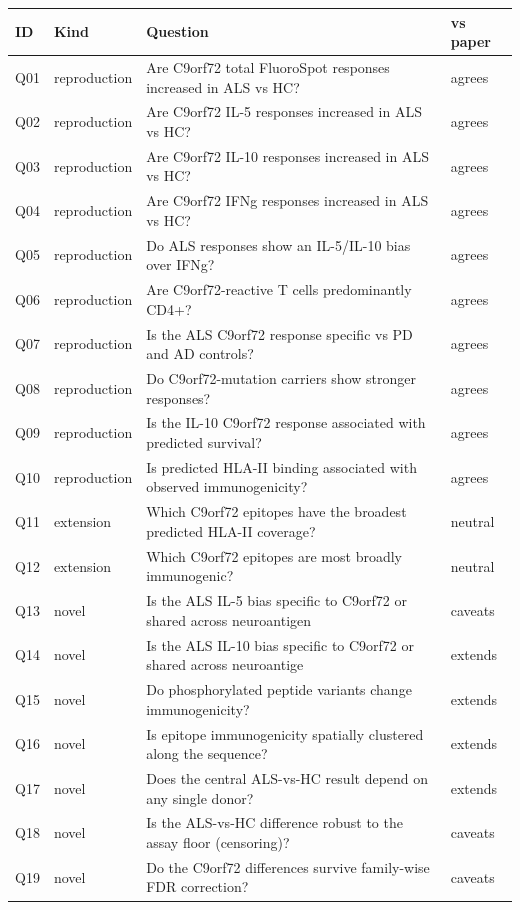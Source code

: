 \begin{tabular}{llp{8.3cm}l}
\toprule
ID & Kind & Question & vs paper \\
\midrule
Q01 & reproduction & Are C9orf72 total FluoroSpot responses increased in ALS vs HC? & agrees \\
Q02 & reproduction & Are C9orf72 IL-5 responses increased in ALS vs HC? & agrees \\
Q03 & reproduction & Are C9orf72 IL-10 responses increased in ALS vs HC? & agrees \\
Q04 & reproduction & Are C9orf72 IFNg responses increased in ALS vs HC? & agrees \\
Q05 & reproduction & Do ALS responses show an IL-5/IL-10 bias over IFNg? & agrees \\
Q06 & reproduction & Are C9orf72-reactive T cells predominantly CD4+? & agrees \\
Q07 & reproduction & Is the ALS C9orf72 response specific vs PD and AD controls? & agrees \\
Q08 & reproduction & Do C9orf72-mutation carriers show stronger responses? & agrees \\
Q09 & reproduction & Is the IL-10 C9orf72 response associated with predicted survival? & agrees \\
Q10 & reproduction & Is predicted HLA-II binding associated with observed immunogenicity? & agrees \\
Q11 & extension & Which C9orf72 epitopes have the broadest predicted HLA-II coverage? & neutral \\
Q12 & extension & Which C9orf72 epitopes are most broadly immunogenic? & neutral \\
Q13 & novel & Is the ALS IL-5 bias specific to C9orf72 or shared across neuroantigen & caveats \\
Q14 & novel & Is the ALS IL-10 bias specific to C9orf72 or shared across neuroantige & extends \\
Q15 & novel & Do phosphorylated peptide variants change immunogenicity? & extends \\
Q16 & novel & Is epitope immunogenicity spatially clustered along the sequence? & extends \\
Q17 & novel & Does the central ALS-vs-HC result depend on any single donor? & extends \\
Q18 & novel & Is the ALS-vs-HC difference robust to the assay floor (censoring)? & caveats \\
Q19 & novel & Do the C9orf72 differences survive family-wise FDR correction? & caveats \\

\end{tabular}
